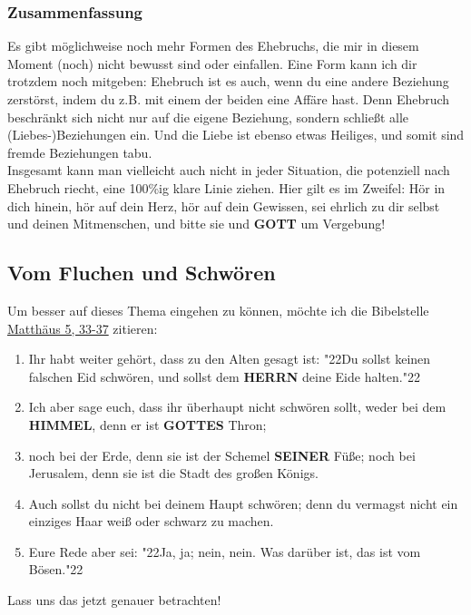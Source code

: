 \documentclass[12pt,a5paper]{article}
\newcommand{\Gottes}[0]{\textbf{GOTTES}}
\newcommand{\Gott}[0]{\textbf{GOTT}}
\newcommand{\Herrn}[0]{\textbf{HERRN}}
\newcommand{\Himmel}[0]{\textbf{HIMMEL}}
\newcommand{\Seiner}[0]{\textbf{SEINER}}
\newcommand{\q}[1]{\char"22{#1}\char"22 }
\begin{document}
	\subsubsection{Zusammenfassung}
		Es gibt m\"oglichweise noch mehr Formen des Ehebruchs,
		die mir in diesem Moment (noch) nicht bewusst sind oder einfallen.
		Eine Form kann ich dir trotzdem noch mitgeben:
		Ehebruch ist es auch,
		wenn du eine andere Beziehung zerst\"orst,
		indem du z.B. mit einem der beiden eine Aff\"are hast.
		Denn Ehebruch beschr\"ankt sich nicht nur auf die eigene Beziehung,
		sondern schlie{\ss}t alle (Liebes-)Beziehungen ein.
		Und die Liebe ist ebenso etwas Heiliges,
		und somit sind fremde Beziehungen tabu.
		\\
		Insgesamt kann man vielleicht auch nicht in jeder Situation,
		die potenziell nach Ehebruch riecht,
		eine 100\%ig klare Linie ziehen.
		Hier gilt es im Zweifel:
		H\"or in dich hinein,
		h\"or auf dein Herz,
		h\"or auf dein Gewissen,
		sei ehrlich zu dir selbst und deinen Mitmenschen,
		und bitte sie und {\Gott} um Vergebung!
					
	\subsection{Vom Fluchen und Schw\"oren}
		Um besser auf dieses Thema eingehen zu k\"onnen,
		m\"ochte ich die Bibelstelle \href{https://www.die-bibel.de/bibeln/online-bibeln/lesen/LU17/MAT.5/Matthäus-5}{Matth\"aus 5, 33-37} zitieren:
		\begin{enumerate}[noitemsep,start=33]
			\item	Ihr habt weiter geh\"ort,
					dass zu den Alten gesagt ist:
					\q{Du sollst keinen falschen Eid schw\"oren,
					und sollst dem {\Herrn} deine Eide halten.}
			\item	Ich aber sage euch,
					dass ihr \"uberhaupt nicht schw\"oren sollt,
					weder bei dem {\Himmel},
					denn er ist {\Gottes} Thron;
			\item	noch bei der Erde,
					denn sie ist der Schemel {\Seiner} F\"u{\ss}e;
					noch bei Jerusalem,
					denn sie ist die Stadt des großen K\"onigs.
			\item	Auch sollst du nicht bei deinem Haupt schw\"oren;
					denn du vermagst nicht ein einziges Haar wei{\ss} oder schwarz zu machen.
			\item	Eure Rede aber sei:
					\q{Ja,
					ja;
					nein,
					nein.
					Was dar\"uber ist,
					das ist vom B\"osen.}
		\end{enumerate}
		Lass uns das jetzt genauer betrachten!
		
\end{document}

